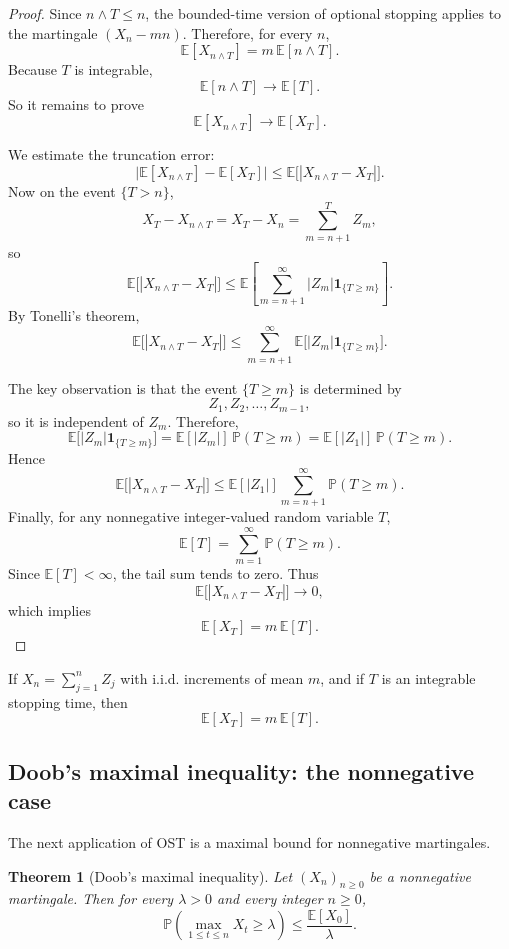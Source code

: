 \documentclass[11pt]{article}
\newtheorem{theorem}{Theorem}[section]
\theoremstyle{definition}
\begin{document}
\begin{proof}
Since \(n\wedge T\le n\), the bounded-time version of optional stopping applies to the martingale \((X_n-mn)\). Therefore, for every \(n\),
\[
\mathbb E[X_{n\wedge T}]=m\,\mathbb E[n\wedge T].
\]
Because \(T\) is integrable,
\[
\mathbb E[n\wedge T]\to \mathbb E[T].
\]
So it remains to prove
\[
\mathbb E[X_{n\wedge T}]\to \mathbb E[X_T].
\]

We estimate the truncation error:
\[
\bigl|\mathbb E[X_{n\wedge T}]-\mathbb E[X_T]\bigr|
\le
\mathbb E\bigl[|X_{n\wedge T}-X_T|\bigr].
\]
Now on the event \(\{T>n\}\),
\[
X_T-X_{n\wedge T}=X_T-X_n=\sum_{m=n+1}^T Z_m,
\]
so
\[
\mathbb E\bigl[|X_{n\wedge T}-X_T|\bigr]
\le
\mathbb E\left[\sum_{m=n+1}^{\infty}|Z_m|\mathbf 1_{\{T\ge m\}}\right].
\]
By Tonelli's theorem,
\[
\mathbb E\bigl[|X_{n\wedge T}-X_T|\bigr]
\le
\sum_{m=n+1}^{\infty}
\mathbb E\bigl[|Z_m|\mathbf 1_{\{T\ge m\}}\bigr].
\]

The key observation is that the event \(\{T\ge m\}\) is determined by
\[
Z_1,Z_2,\dots,Z_{m-1},
\]
so it is independent of \(Z_m\). Therefore,
\[
\mathbb E\bigl[|Z_m|\mathbf 1_{\{T\ge m\}}\bigr]
=
\mathbb E[|Z_m|]\,\mathbb P(T\ge m)
=
\mathbb E[|Z_1|]\,\mathbb P(T\ge m).
\]
Hence
\[
\mathbb E\bigl[|X_{n\wedge T}-X_T|\bigr]
\le
\mathbb E[|Z_1|]\sum_{m=n+1}^{\infty}\mathbb P(T\ge m).
\]
Finally, for any nonnegative integer-valued random variable \(T\),
\[
\mathbb E[T]=\sum_{m=1}^{\infty}\mathbb P(T\ge m).
\]
Since \(\mathbb E[T]<\infty\), the tail sum tends to zero. Thus
\[
\mathbb E\bigl[|X_{n\wedge T}-X_T|\bigr]\to 0,
\]
which implies
\[
\mathbb E[X_T]=m\,\mathbb E[T].
\]
\end{proof}

\begin{keyformula}
If \(X_n=\sum_{j=1}^n Z_j\) with i.i.d. increments of mean \(m\), and if \(T\) is an integrable stopping time, then
\[
\mathbb E[X_T]=m\,\mathbb E[T].
\]
\end{keyformula}

\subsection{Doob's maximal inequality: the nonnegative case}

The next application of OST is a maximal bound for nonnegative martingales.

\begin{theorem}[Doob's maximal inequality]
Let \((X_n)_{n\ge 0}\) be a nonnegative martingale. Then for every \(\lambda>0\) and every integer \(n\ge 0\),
\[
\mathbb P\!\left(\max_{1\le t\le n} X_t\ge \lambda\right)
\le
\frac{\mathbb E[X_0]}{\lambda}.
\]
\end{theorem}
\end{document}
